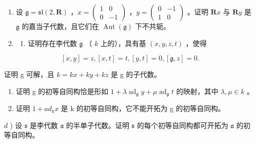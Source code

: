\begin{enumerate}
\def\labelenumi{\arabic{enumi})}
\setcounter{enumi}{3}
\item
  设 \(\mathfrak{g} = \mathfrak{sl}(2, \mathbf{R})\) ，\(x = \begin{pmatrix} 1 & 0 \\ 0 & -1 \end{pmatrix}\) ，\(y = \begin{pmatrix} 0 & -1 \\ 1 & 0 \end{pmatrix}\) 。证明 \(\mathbf{R}x\) 与 \(\mathbf{R}y\) 是 \(\mathfrak{g}\) 的嘉当子代数，且它们在 \(\operatorname{Aut}(\mathfrak{g})\) 下不共轭。
\item
  \begin{enumerate}
  \def\labelenumii{\alph{enumii})}
  \tightlist
  \item
    证明存在李代数 \(\mathfrak{g}\) （ \(k\) 上的），具有基 \((x,y,z,t)\) ，使得
  \end{enumerate}
\end{enumerate}

\[
[ x, y ] = z, [ x, t ] = t, [ y, t ] = 0, [ \mathfrak {g}, z ] = 0.
\]

证明 g 可解，且 \(k = kx + ky + kz\) 是 g 的子代数。

\begin{enumerate}
\def\labelenumi{\alph{enumi})}
\setcounter{enumi}{1}
\item
  证明 g 的初等自同构恰是形如 \(1 + \lambda \operatorname{ad}_{\mathfrak{g}} y + \mu \operatorname{ad}_{\mathfrak{g}} t\) 的映射，其中 \(\lambda, \mu \in k\) 。
\item
  证明 \(1 + ad_{k}x\) 是 k 的初等自同构，它不能开拓为 g 的初等自同构。
\end{enumerate}

\(d\) ) 设 \(\mathfrak{s}\) 是李代数 \(\mathfrak{a}\) 的半单子代数。证明 \(\mathfrak{s}\) 的每个初等自同构都可开拓为 \(\mathfrak{a}\) 的初等自同构。

